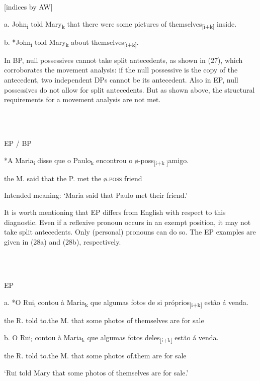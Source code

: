 \documentclass[output=paper]{langsci/langscibook}
\begin{document}
          \citet[346]{Lebeaux1985} [indices by AW]  

  a.  John\textsubscript{i} told Mary\textsubscript{k} that there were some pictures of themselves\textsubscript{[i+k]} inside.

  b.  *John\textsubscript{i} told Mary\textsubscript{k} about themselves\textsubscript{[i+k]}.

In BP, null possessives cannot take split antecedents, as shown in (27), which corroborates the movement analysis: if the null possessive is the copy of the antecedent, two independent DPs cannot be its antecedent. Also in EP, null possessives do not allow for split antecedents. But as shown above, the structural requirements for a movement analysis are not met.

\ea%
    \label{ex:key:27}
    \gll\\
        \\
    \glt
    \z

          EP / BP \citep[130]{Rodrigues2010}

*A Maria\textsubscript{i} disse que o Paulo\textsubscript{k} encontrou o ø-poss\textsubscript{[i+k ]}amigo.

the M. said that the P. met the ø\textsc{.poss} friend  

Intended meaning: ‘Maria said that Paulo met their friend.’

It is worth mentioning that EP differs from English with respect to this diagnostic. Even if a reflexive pronoun occurs in an exempt position, it may not take split antecedents. Only (personal) pronouns can do so. The EP examples are given in (28a) and (28b), respectively.

\ea%
    \label{ex:key:28}
    \gll\\
        \\
    \glt
    \z

          EP

  a.  *O Rui\textsubscript{i} contou à Maria\textsubscript{k} que algumas fotos de si próprios\textsubscript{[i+k]} estão á venda.

the R.   told to.the M. that some photos of themselves are for sale

  b.  O Rui\textsubscript{i} contou à Maria\textsubscript{k} que algumas fotos deles\textsubscript{[i+k]} estão á venda.

the R.   told to.the M. that some photos of.them are for sale

‘Rui told Mary that some photos of themselves are for sale.’
\end{document}
